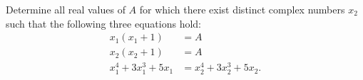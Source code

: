 Determine all real values of $A$ for which there exist distinct complex numbers  $x_2$ such that the following three equations hold:
\begin{align*}x_1(x_1+1)&=A\\x_2(x_2+1)&=A\\x_1^4+3x_1^3+5x_1&=x_2^4+3x_2^3+5x_2.\end{align*}